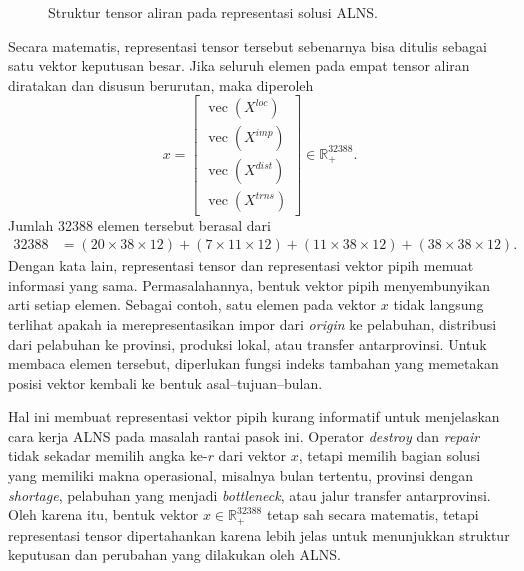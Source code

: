 \documentclass{file/TA-ITS}
\theoremstyle{definition}
\theoremstyle{definition}
\theoremstyle{plain}
\begin{document}
\begin{figure}[H]
{
}
\caption{Struktur tensor aliran pada representasi solusi ALNS.}
\label{fig:tensor-solusi-alns}
\end{figure}

Secara matematis, representasi tensor tersebut sebenarnya bisa ditulis sebagai satu vektor keputusan besar. Jika seluruh elemen pada empat tensor aliran diratakan dan disusun berurutan, maka diperoleh
\[
x =
\begin{bmatrix}
\operatorname{vec}\left(X^{loc}\right) \\
\operatorname{vec}\left(X^{imp}\right) \\
\operatorname{vec}\left(X^{dist}\right) \\
\operatorname{vec}\left(X^{trns}\right)
\end{bmatrix}
\in \mathbb{R}_{+}^{32388}.
\]
Jumlah 32388 elemen tersebut berasal dari
\[
\begin{aligned}
32388
&=
(20 \times 38 \times 12)
+ (7 \times 11 \times 12)
+ (11 \times 38 \times 12)
+ (38 \times 38 \times 12).
\end{aligned}
\]
Dengan kata lain, representasi tensor dan representasi vektor pipih memuat informasi yang sama. Permasalahannya, bentuk vektor pipih menyembunyikan arti setiap elemen. Sebagai contoh, satu elemen pada vektor \(x\) tidak langsung terlihat apakah ia merepresentasikan impor dari \textit{origin} ke pelabuhan, distribusi dari pelabuhan ke provinsi, produksi lokal, atau transfer antarprovinsi. Untuk membaca elemen tersebut, diperlukan fungsi indeks tambahan yang memetakan posisi vektor kembali ke bentuk asal--tujuan--bulan.

Hal ini membuat representasi vektor pipih kurang informatif untuk menjelaskan cara kerja ALNS pada masalah rantai pasok ini. Operator \textit{destroy} dan \textit{repair} tidak sekadar memilih angka ke-\(r\) dari vektor \(x\), tetapi memilih bagian solusi yang memiliki makna operasional, misalnya bulan tertentu, provinsi dengan \textit{shortage}, pelabuhan yang menjadi \textit{bottleneck}, atau jalur transfer antarprovinsi. Oleh karena itu, bentuk vektor \(x \in \mathbb{R}_{+}^{32388}\) tetap sah secara matematis, tetapi representasi tensor dipertahankan karena lebih jelas untuk menunjukkan struktur keputusan dan perubahan yang dilakukan oleh ALNS.
\end{document}
